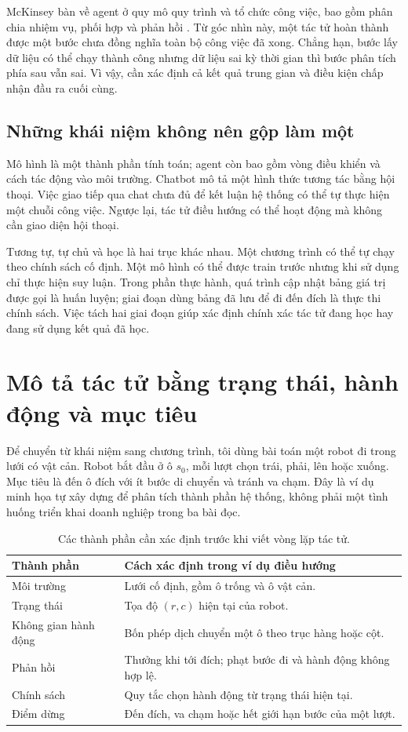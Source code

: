 McKinsey bàn về agent ở quy mô quy trình và tổ chức công việc, bao gồm phân chia nhiệm vụ, phối hợp và phản hồi \cite{mckinsey}. Từ góc nhìn này, một tác tử hoàn thành được một bước chưa đồng nghĩa toàn bộ công việc đã xong. Chẳng hạn, bước lấy dữ liệu có thể chạy thành công nhưng dữ liệu sai kỳ thời gian thì bước phân tích phía sau vẫn sai. Vì vậy, cần xác định cả kết quả trung gian và điều kiện chấp nhận đầu ra cuối cùng.

\subsection{Những khái niệm không nên gộp làm một}
Mô hình là một thành phần tính toán; agent còn bao gồm vòng điều khiển và cách tác động vào môi trường. Chatbot mô tả một hình thức tương tác bằng hội thoại. Việc giao tiếp qua chat chưa đủ để kết luận hệ thống có thể tự thực hiện một chuỗi công việc. Ngược lại, tác tử điều hướng có thể hoạt động mà không cần giao diện hội thoại.

Tương tự, tự chủ và học là hai trục khác nhau. Một chương trình có thể tự chạy theo chính sách cố định. Một mô hình có thể được train trước nhưng khi sử dụng chỉ thực hiện suy luận. Trong phần thực hành, quá trình cập nhật bảng giá trị được gọi là huấn luyện; giai đoạn dùng bảng đã lưu để đi đến đích là thực thi chính sách. Việc tách hai giai đoạn giúp xác định chính xác tác tử đang học hay đang sử dụng kết quả đã học.

\clearpage
\section{Mô tả tác tử bằng trạng thái, hành động và mục tiêu}
Để chuyển từ khái niệm sang chương trình, tôi dùng bài toán một robot đi trong lưới có vật cản. Robot bắt đầu ở ô $s_0$, mỗi lượt chọn trái, phải, lên hoặc xuống. Mục tiêu là đến ô đích với ít bước di chuyển và tránh va chạm. Đây là ví dụ minh họa tự xây dựng để phân tích thành phần hệ thống, không phải một tình huống triển khai doanh nghiệp trong ba bài đọc.

\begin{table}[H]\centering\small
\caption{Các thành phần cần xác định trước khi viết vòng lặp tác tử.}
\begin{tabularx}{\textwidth}{@{}p{3cm}Y@{}}\toprule
Thành phần & Cách xác định trong ví dụ điều hướng \\\midrule
Môi trường & Lưới cố định, gồm ô trống và ô vật cản. \\
Trạng thái & Tọa độ $(r,c)$ hiện tại của robot. \\
Không gian hành động & Bốn phép dịch chuyển một ô theo trục hàng hoặc cột. \\
Phản hồi & Thưởng khi tới đích; phạt bước đi và hành động không hợp lệ. \\
Chính sách & Quy tắc chọn hành động từ trạng thái hiện tại. \\
Điểm dừng & Đến đích, va chạm hoặc hết giới hạn bước của một lượt. \\\bottomrule
\end{tabularx}
\end{table}

